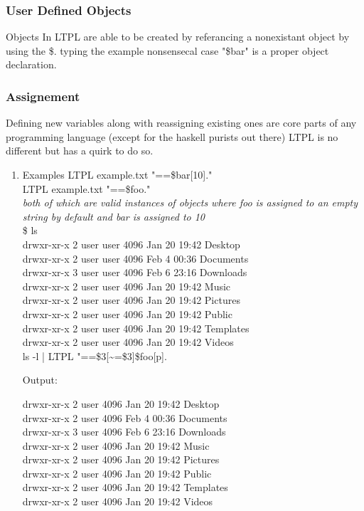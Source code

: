 \documentclass[11pt]{article}
\begin{document}
\subsubsection{User Defined Objects}
\label{sec:org8b8f355}
Objects In LTPL are able to be created by referancing a nonexistant object by using the \$.
typing the example nonsensecal case "\$bar" is a proper object declaration.
\subsubsection{Assignement}
\label{sec:org5ee19a2}
Defining new variables along with reassigning existing ones are core parts of any programming language (except for the haskell purists out there)
LTPL is no different but has a quirk to do so.
\begin{enumerate}
\item Examples
\label{sec:orga2996b6}
LTPL example.txt "==\$bar[10]."\\
LTPL example.txt "==\$foo."\\
\emph{both of which are valid instances of objects where foo is assigned to an empty string by default and bar is assigned to 10} \\

\$ ls \\

drwxr-xr-x 2 user user  4096 Jan 20 19:42 Desktop \\
drwxr-xr-x 2 user user  4096 Feb  4 00:36 Documents \\
drwxr-xr-x 3 user user  4096 Feb  6 23:16 Downloads \\
drwxr-xr-x 2 user user  4096 Jan 20 19:42 Music \\
drwxr-xr-x 2 user user  4096 Jan 20 19:42 Pictures \\
drwxr-xr-x 2 user user  4096 Jan 20 19:42 Public \\
drwxr-xr-x 2 user user  4096 Jan 20 19:42 Templates \\
drwxr-xr-x 2 user user  4096 Jan 20 19:42 Videos \\

ls -l | LTPL "==\$3[\textasciitilde{}=\$3]\$foo[p].

Output:

drwxr-xr-x 2 user 4096 Jan 20 19:42 Desktop \\
drwxr-xr-x 2 user 4096 Feb  4 00:36 Documents \\
drwxr-xr-x 3 user 4096 Feb  6 23:16 Downloads \\
drwxr-xr-x 2 user 4096 Jan 20 19:42 Music \\
drwxr-xr-x 2 user 4096 Jan 20 19:42 Pictures \\
drwxr-xr-x 2 user 4096 Jan 20 19:42 Public \\
drwxr-xr-x 2 user 4096 Jan 20 19:42 Templates \\
drwxr-xr-x 2 user 4096 Jan 20 19:42 Videos \\
\end{enumerate}
\end{document}
